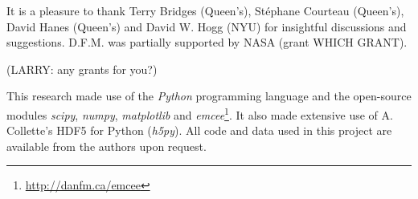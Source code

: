 \documentclass[preprint]{aastex}
\newcommand{\project}[1]{\emph{#1}}
\begin{document}

\acknowledgments It is a pleasure to thank Terry Bridges (Queen's),
St\'ephane Courteau (Queen's), David Hanes (Queen's) and David W. Hogg (NYU)
for insightful discussions and suggestions. D.F.M. was partially supported
by NASA (grant WHICH GRANT).

(LARRY: any grants for you?)

This research made use of the \project{Python} programming language and the
open-source modules \project{scipy}, \project{numpy}, \project{matplotlib}
and \project{emcee}\footnote{\url{http://danfm.ca/emcee}}.  It also
made extensive use of A. Collette's HDF5 for Python (\project{h5py}). All
code and data used in this project are available from the authors upon
request.



\end{document}
